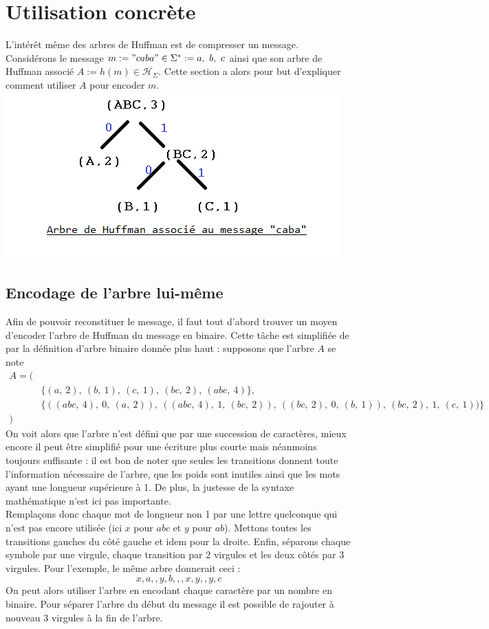 \documentclass[a4paper, 12pt]{article}
\begin{document}
\newpage

\section{Utilisation concrète}
L'intérêt même des arbres de Huffman est de compresser un message. Considérons le message $m := "caba" \in\Sigma^* := {a,\ b,\ c}$ ainsi que son arbre de Huffman associé $A:=h(m)\in\overline{\mathcal{H}_\Sigma}$. Cette section a alors pour but d'expliquer comment utiliser $A$ pour encoder $m$. \\
\includegraphics[width=\linewidth]{treecaba.png}

\subsection{Encodage de l'arbre lui-même}
Afin de pouvoir reconstituer le message, il faut tout d'abord trouver un moyen d'encoder l'arbre de Huffman du message en binaire. Cette tâche est simplifiée de par la définition d'arbre binaire donnée plus haut : supposons que l'arbre $A$ se note
\begin{align*}
A = (& \\
	&\{(a,\ 2),\ (b,\ 1),\ (c,\ 1),\ (bc,\ 2),\ (abc,\ 4)\}, \\
	&\{((abc,\ 4),\ 0,\ (a,\ 2)),\ ((abc,\ 4),\ 1,\ (bc,\ 2)),\ ((bc,\ 2),\ 0,\ (b,\ 1)),\ (bc,\ 2),\ 1,\ (c,\ 1))\} \\
)&
\end{align*}
On voit alors que l'arbre n'est défini que par une succession de caractères, mieux encore il peut être simplifié pour une écriture plus courte mais néanmoins toujours suffisante :
il est bon de noter que seules les transitions donnent toute l'information nécessaire de l'arbre, que les poids sont inutiles ainsi que les mots ayant une longueur supérieure à 1. De plus, la justesse de la syntaxe mathématique n'est ici pas importante. \\
Remplaçons donc chaque mot de longueur non 1 par une lettre quelconque qui n'est pas encore utilisée (ici $x$ pour $abc$ et $y$ pour $ab$). Mettons toutes les transitions gauches du côté gauche et idem pour la droite. Enfin, séparons chaque symbole par une virgule, chaque transition par 2 virgules et les deux côtés par 3 virgules. Pour l'exemple, le même arbre donnerait ceci :
$$
x,a,,y,b,,,x,y,,y,c
$$
On peut alors utiliser l'arbre en encodant chaque caractère par un nombre en binaire. Pour séparer l'arbre du début du message il est possible de rajouter à nouveau 3 virgules à la fin de l'arbre.
\end{document}
